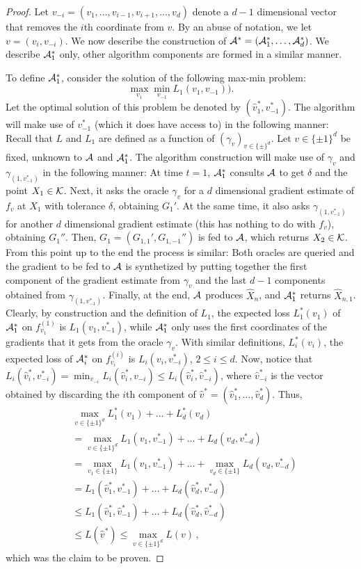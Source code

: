 \begin{proof}
Let $v_{-i}=(v_1,\ldots,v_{i-1},v_{i+1},\ldots,v_d)$ denote a $d-1$ dimensional vector that removes the $i$th coordinate from $v$. By an abuse of notation, we let $v=(v_i, v_{-i})$. 
We now describe the construction of $\mathcal{A}^*=(\mathcal{A}_1^*, \ldots, \mathcal{A}_d^*)$.
We describe $\mathcal{A}_1^*$ only, other algorithm components are formed in a similar manner.

To define $\mathcal{A}_1^*$, consider the solution of the following max-min problem:
\[
\max_{v_1} \min_{v_{-1}} L_1(v_1, v_{-1})).
\]
Let the optimal solution of this problem be denoted by $(\hat{v}_1^*,v_{-1}^*)$.
The algorithm will make use of $v_{-1}^*$ (which it does have access to) in the following manner:
Recall that $L$ and $L_1$ are defined as a function of $(\gamma_v)_{v\in \{\pm\}^d}$.
Let $v\in \{\pm 1\}^d$ be fixed, unknown to $\mathcal{A}$ and $\mathcal{A}_1^*$. 
The algorithm construction will make use of $\gamma_v$ and $\gamma_{(1,v_{-1}^*)}$ in the following manner:
At time $t=1$, $\mathcal{A}_1^*$ consults $\mathcal{A}$ to get $\delta$ and the point $X_1\in \mathcal{K}$.
Next, it asks the oracle $\gamma_v$ for a $d$ dimensional gradient estimate of $f_v$ at $X_1$ with tolerance $\delta$,
obtaining $G_1'$.
At the same time, it also asks $\gamma_{(1,v_{-1}^*)}$ for another $d$ dimensional gradient estimate (this has nothing to do with $f_v$), obtaining $G_1''$.
Then, $G_1 = (G_{1,1}',G_{1,-1}'')$ is fed to $\mathcal{A}$, which returns $X_2\in \mathcal{K}$. From this point up to the end the process is similar: Both oracles are queried and the gradient to be fed to $\mathcal{A}$ is synthetized by putting together the first component of the gradient estimate from $\gamma_v$ and the last $d-1$ components obtained from $\gamma_{(1,v_{-1}^*)}$.
Finally, at the end, $\mathcal{A}$ produces $\hat{X}_n$, and $\mathcal{A}_1^*$ returns $\hat{X}_{n,1}$.
Clearly, by construction and the definition of $L_1$,
the expected loss $L^*_1(v_1)$ of $\mathcal{A}_1^*$ on $f_{v_1}^{(1)}$ is $L_1(v_1,v_{-1}^*)$, while $\mathcal{A}_1^*$ only uses the first coordinates of the gradients that it gets from the oracle $\gamma_v$.
With similar definitions, $L^*_i(v_i)$, the expected loss of $\mathcal{A}_i^*$ on $f_{v_i}^{(i)}$ is $L_i(v_i,v_{-i}^*)$, $2\le i \le d$.
Now, notice that $L_i(\hat{v}_i^*,v_{-i}^*) = \min_{v_{-i} } L_i(\hat{v}_i^*,v_{-i}) \le L_i(\hat{v}_i^*, \hat{v}_{-i}^*)$,
where $\hat{v}_{-i}^*$ is the vector obtained by discarding the $i$th component of $\hat{v}^* = (\hat{v}_1^*,\dots,\hat{v}_d^*)$.
Thus,
\begin{align*}
&\max_{v\in \{\pm 1 \}^d }
L^*_1(v_1) + \dots + L^*_d(v_d) \\
&   = \max_{v\in \{\pm 1 \}^d } L_1(v_1,v_{-1}^*) + \dots + L_d(v_d,v_{-d}^*)\\
& = \max_{v_1\in \{\pm 1\}} L_1(v_1,v_{-1}^*) + \dots +  \max_{v_d\in \{\pm 1\}} L_d(v_d,v_{-d}^*)\\
& = L_1(\hat{v}^*_1,v_{-1}^*) + \dots +   L_d(\hat{v}^*_d,v_{-d}^*)\\
& \le L_1(\hat{v}^*_1,\hat{v}_{-1}^*) + \dots +  L_d(\hat{v}^*_d,\hat{v}_{-d}^*)\\
& \le L(\hat{v}^*) \le \max_{v\in \{\pm 1\}^d } L(v)\,,
\end{align*}
which was the claim to be proven.
\end{proof}

